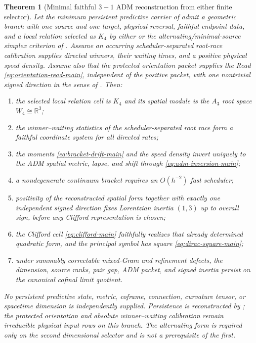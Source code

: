 \documentclass[11pt]{article}
\newtheorem{theorem}{Theorem}[section]
\numberwithin{equation}{section}
\theoremstyle{definition}
\theoremstyle{remark}
\newcommand{\R}{\mathbb R}
\begin{document}
\begin{theorem}[Minimal faithful $3+1$ ADM reconstruction from either finite selector]
\label{mt:adm}
Let the minimum persistent predictive carrier of  admit a
geometric branch with one source and one target, physical reversal, faithful
endpoint data, and a local relation selected as $K_4$ by either
 or the alternating/minimal-source simplex
criterion of .  Assume an occurring
scheduler-separated root-race calibration supplies directed winners, their
waiting times, and a positive physical speed density.  Assume also that the
protected orientation packet supplies the Read
\eqref{eq:orientation-read-main}, independent of the positive packet, with one
nontrivial signed direction in the sense of
.  Then:
\begin{enumerate}[label=\textup{(\roman*)},leftmargin=2.8em]
\item the selected local relation cell is $K_4$ and its spatial module is the
      $A_3$ root space $W_4\cong\R^3$;
\item the winner--waiting statistics of the scheduler-separated root race form
      a faithful coordinate system for all directed rates;
\item the moments \eqref{eq:bracket-drift-main} and the speed density invert
      uniquely to the ADM spatial metric, lapse, and shift through
      \eqref{eq:adm-inversion-main};
\item a nondegenerate continuum bracket requires an $O(h^{-2})$ fast scheduler;
\item positivity of the reconstructed spatial form together with exactly one
      independent signed direction fixes Lorentzian inertia $(1,3)$ up to
      overall sign, before any Clifford representation is chosen;
\item the Clifford cell \eqref{eq:clifford-main} faithfully realizes that
      already determined quadratic form, and the principal symbol has square
      \eqref{eq:dirac-square-main};
\item under summably correctable mixed-Gram and refinement defects, the
      dimension, source ranks, pair gap, ADM packet, and signed inertia persist
      on the canonical cofinal limit quotient.
\end{enumerate}
No persistent predictive state, metric, coframe, connection, curvature tensor,
or spacetime dimension is independently supplied.  Persistence is reconstructed
by ; the protected orientation and absolute
winner--waiting calibration remain irreducible physical input rows on this
branch.  The alternating form is required only on the second dimensional
selector and is not a prerequisite of the first.
\end{theorem}
\end{document}
